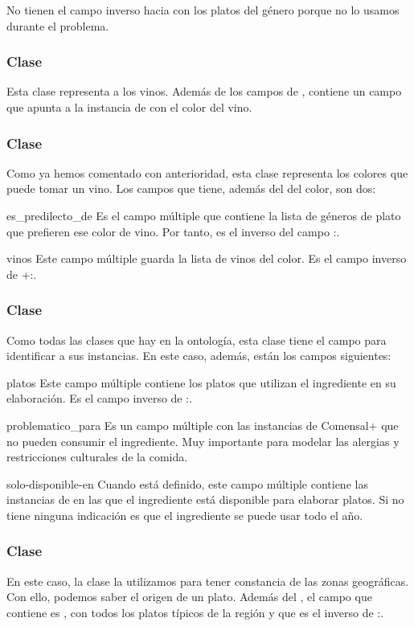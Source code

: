 No tienen el campo inverso hacia  con los platos del género porque
no lo usamos durante el problema.

\subsubsection{Clase }
Esta clase representa a los vinos. Además de los campos de ,
contiene un campo  que apunta a la instancia de 
con el color del vino.

\subsubsection{Clase }
Como ya hemos comentado con anterioridad, esta clase representa los colores que
puede tomar un vino. Los campos que tiene, además del  del color,
son dos:
\begin{slotlist}
\item[es\_predilecto\_de] Es el campo múltiple que contiene la lista de géneros
  de plato que prefieren ese color de vino. Por tanto, es el inverso del campo
  :.
\item[vinos] Este campo múltiple guarda la lista de vinos del color. Es el
  campo inverso de +:.
\end{slotlist}

\subsubsection{Clase }
Como todas las clases que hay en la ontología, esta clase tiene el campo
 para identificar a sus instancias. En este caso, además, están
los campos siguientes:
\begin{slotlist}
\item[platos] Este campo múltiple contiene los platos que utilizan el
  ingrediente en su elaboración. Es el campo inverso de
  :.
\item[problematico\_para] Es un campo múltiple con las instancias de
   Comensal+ que no pueden consumir el ingrediente. Muy importante
  para modelar las alergias y restricciones culturales de la comida.
\item[solo-disponible-en] Cuando está definido, este campo múltiple contiene
  las instancias de  en las que el ingrediente está disponible para
  elaborar platos. Si no tiene ninguna indicación es que el ingrediente se
  puede usar todo el año.
\end{slotlist}

\subsubsection{Clase }
En este caso, la clase la utilizamos para tener constancia de las zonas
geográficas. Con ello, podemos saber el origen de un plato. Además del
, el campo que contiene es , con todos los
platos típicos de la región y que es el inverso de
:.


